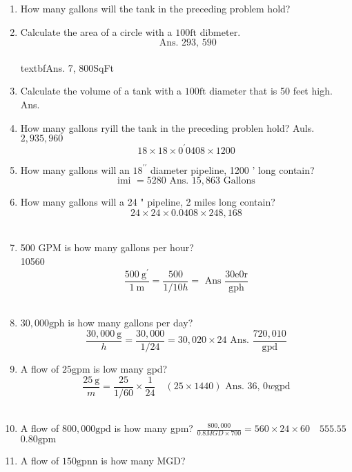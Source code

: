 \begin{enumerate}
\item How many gallons will the tank in the preceding problem hold?\\
\item Calculate the area of a circle with a $100 \mathrm{ft}$ dibmeter.\\
$$
\text { Ans. 293, } 590
$$
\\textbf{Ans. 7, 800SqFt}\\
\item Calculate the volume of a tank with a $100 \mathrm{ft}$ diameter that is 50 feet high. Ans.\\
\item How many gallons ryill the tank in the preceding problen hold? Auls.\\
$2,935,960$\\
$$
18 \times 18 \times 0^{\prime} 0408 \times 1200
$$
\item How many gallons will an $18^{\prime \prime}$ diameter pipeline, 1200 ' long contain?\\
$$
\text { imi }=5280 \text { Ans. } 15,863 \text { Gallons }
$$
\item How many gallons will a 24 " pipeline, 2 miles long contain?\\
$$
24 \times 24 \times 0.0408 \times 248,168
$$\\
\item 500 GPM is how many gallons per hour?\\
10560\\
$$
\frac{500 \mathrm{~g}^{\prime}}{1 \mathrm{~m}}=\frac{500}{1 / 10 h}=\text { Ans } \frac{30 \mathrm{e} 0 \mathrm{r}}{\mathrm{gph}}
$$\\
\item $30,000 \mathrm{gph}$ is how many gallons per day?\\
$$
\frac{30,000 \mathrm{~g}}{h}=\frac{30,000}{1 / 24}=30,020 \times 24 \text { Ans. } \frac{720,010}{\mathrm{gpd}}
$$
\item A flow of $25 \mathrm{gpm}$ is low many gpd?\\
$$
\frac{25 \mathrm{~g}}{m}=\frac{25}{1 / 60} \times \frac{1}{24} \quad(25 \times 1440) \text { Ans. 36, } 0 w \mathrm{gpd}
$$\\
\item A flow of $800,000 \mathrm{gpd}$ is how many gpm? $\frac{800,000}{0.8 M G D \times 700}=560 \times 24 \times 60 \quad 555.55$ $0.80 \mathrm{gpm}$\\
\item A flow of $150 \mathrm{gpnn}$ is how many MGD?\\

\end{enumerate}
